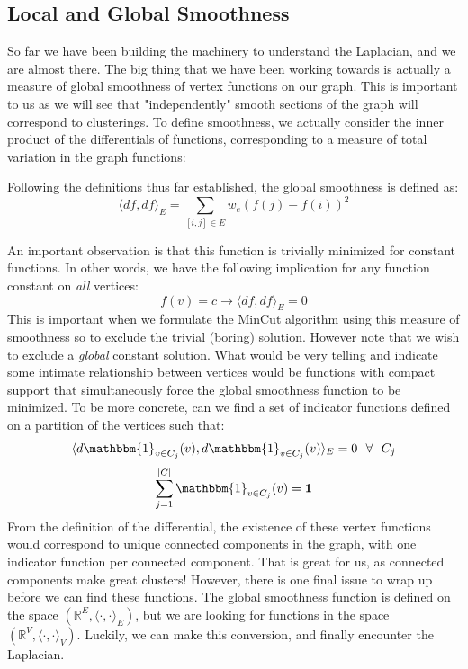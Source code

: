 \subsection{Local and Global Smoothness}
So far we have been building the machinery to understand the
Laplacian, and we are almost there. The big thing that we have been
working towards is actually a measure of global smoothness of vertex
functions on our graph. This is important to us as we will see that
"independently" smooth sections of the graph will correspond to
clusterings. To define smoothness, we actually consider the inner
product of the differentials of functions, corresponding to a measure
of total variation in the graph functions: 
\begin{definition}
Following the definitions thus far established, the global smoothness
is defined as: \[\langle df, df \rangle_E = \sum_{[i,j] \in E}w_e(f(j)
-f(i))^2\] 
\end{definition}
An important observation is that this function is trivially minimized
for constant functions. In other words, we have the following
implication for any function constant on \textit{all} vertices: 
\[
f(v) = c \rightarrow \langle df, df \rangle_E = 0
\]
This is important when we formulate the MinCut algorithm using this
measure of smoothness so to exclude the trivial (boring)
solution. However note that we wish to exclude a \textit{global}
constant solution. What would be very telling and indicate some
intimate relationship between vertices would be functions with compact
support that simultaneously force the global smoothness function to be
minimized. To be more concrete, can we find a set of indicator
functions defined on a partition of the vertices such that: 
\[
\langle d\mathbbm{1}_{v \in C_j}(v), d\mathbbm{1}_{v \in C_j}(v)
\rangle_E = 0 \: \: \: \forall \: \: \: C_j 
\]
\[
\sum_{j=1}^{|C|} \mathbbm{1}_{v \in C_j}(v) = \mathbf{1}
\]
From the definition of the differential, the existence of these vertex
functions would correspond to unique connected components in the
graph, with one indicator function per connected component. That is
great for us, as connected components make great clusters! However,
there is one final issue to wrap up before we can find these
functions. The global smoothness function is defined on the space
\((\mathbb{R}^E, \langle \cdot, \cdot \rangle_E)\), but we are looking
for functions in the space \((\mathbb{R}^V, \langle \cdot, \cdot
\rangle_V)\). Luckily, we can make this conversion, and finally
encounter the Laplacian.

